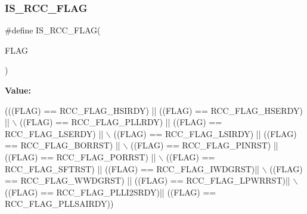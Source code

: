 \subsubsection{\texorpdfstring{I\+S\+\_\+\+R\+C\+C\+\_\+\+F\+L\+AG}{IS\_RCC\_FLAG}}
{\footnotesize\ttfamily \#define I\+S\+\_\+\+R\+C\+C\+\_\+\+F\+L\+AG(\begin{DoxyParamCaption}\item[{}]{F\+L\+AG }\end{DoxyParamCaption})}

{\bfseries Value\+:}
\begin{DoxyCode}
(((FLAG) == RCC\_FLAG\_HSIRDY)   || ((FLAG) == RCC\_FLAG\_HSERDY) || \(\backslash\)
                           ((FLAG) == RCC\_FLAG\_PLLRDY)   || ((FLAG) == RCC\_FLAG\_LSERDY) || \(\backslash\)
                           ((FLAG) == RCC\_FLAG\_LSIRDY)   || ((FLAG) == RCC\_FLAG\_BORRST) || \(\backslash\)
                           ((FLAG) == RCC\_FLAG\_PINRST)   || ((FLAG) == RCC\_FLAG\_PORRST) || \(\backslash\)
                           ((FLAG) == RCC\_FLAG\_SFTRST)   || ((FLAG) == RCC\_FLAG\_IWDGRST)|| \(\backslash\)
                           ((FLAG) == RCC\_FLAG\_WWDGRST)  || ((FLAG) == RCC\_FLAG\_LPWRRST)|| \(\backslash\)
                           ((FLAG) == RCC\_FLAG\_PLLI2SRDY)|| ((FLAG) == RCC\_FLAG\_PLLSAIRDY))
\end{DoxyCode}
